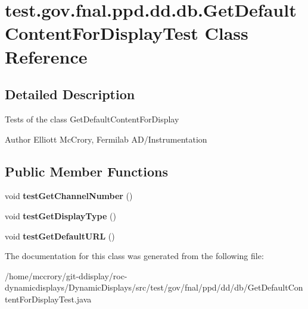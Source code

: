\hypertarget{classtest_1_1gov_1_1fnal_1_1ppd_1_1dd_1_1db_1_1GetDefaultContentForDisplayTest}{\section{test.\-gov.\-fnal.\-ppd.\-dd.\-db.\-Get\-Default\-Content\-For\-Display\-Test Class Reference}
\label{classtest_1_1gov_1_1fnal_1_1ppd_1_1dd_1_1db_1_1GetDefaultContentForDisplayTest}
}


\subsection{Detailed Description}
Tests of the class Get\-Default\-Content\-For\-Display

\begin{DoxyAuthor}{Author}
Elliott Mc\-Crory, Fermilab A\-D/\-Instrumentation 
\end{DoxyAuthor}
\subsection*{Public Member Functions}
\begin{DoxyCompactItemize}
\item 
\hypertarget{classtest_1_1gov_1_1fnal_1_1ppd_1_1dd_1_1db_1_1GetDefaultContentForDisplayTest_a537c7cee8b9dbb1afadb523af89feda6}{void {\bfseries test\-Get\-Channel\-Number} ()}\label{classtest_1_1gov_1_1fnal_1_1ppd_1_1dd_1_1db_1_1GetDefaultContentForDisplayTest_a537c7cee8b9dbb1afadb523af89feda6}

\item 
\hypertarget{classtest_1_1gov_1_1fnal_1_1ppd_1_1dd_1_1db_1_1GetDefaultContentForDisplayTest_a949d9e3ff3f8fea11b3cdee4bc8860e4}{void {\bfseries test\-Get\-Display\-Type} ()}\label{classtest_1_1gov_1_1fnal_1_1ppd_1_1dd_1_1db_1_1GetDefaultContentForDisplayTest_a949d9e3ff3f8fea11b3cdee4bc8860e4}

\item 
\hypertarget{classtest_1_1gov_1_1fnal_1_1ppd_1_1dd_1_1db_1_1GetDefaultContentForDisplayTest_a5e31b72bf0bf1b903d7280366872a11e}{void {\bfseries test\-Get\-Default\-U\-R\-L} ()}\label{classtest_1_1gov_1_1fnal_1_1ppd_1_1dd_1_1db_1_1GetDefaultContentForDisplayTest_a5e31b72bf0bf1b903d7280366872a11e}

\end{DoxyCompactItemize}


The documentation for this class was generated from the following file\-:\begin{DoxyCompactItemize}
\item 
/home/mccrory/git-\/ddisplay/roc-\/dynamicdisplays/\-Dynamic\-Displays/src/test/gov/fnal/ppd/dd/db/Get\-Default\-Content\-For\-Display\-Test.\-java\end{DoxyCompactItemize}
